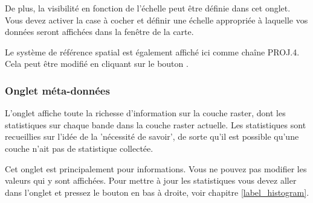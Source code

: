 De plus, la visibilité en fonction de l'échelle peut être définie dans cet
onglet. Vous devez activer la case à cocher et définir une échelle appropriée à
laquelle vos données seront affichées dans la fenêtre de la carte.

Le système de référence spatial est également affiché ici comme chaîne PROJ.4.
Cela peut être modifié en cliquant sur le bouton .

\subsubsection{Onglet méta-données}\label{label_metatab}

L'onglet  affiche toute la richesse d'information sur la
couche raster, dont les statistiques sur chaque bande dans la couche raster
actuelle. Les statistiques sont recueillies sur l'idée de la 'nécessité de
savoir', de sorte qu'il est possible qu'une couche n'ait pas de
statistique collectée. 

Cet onglet est principalement pour informations. Vous ne pouvez pas modifier
les valeurs qui y sont affichées. Pour mettre à jour les statistiques vous
devez aller dans l'onglet  et pressez le bouton
 en bas à droite, voir chapitre \ref{label_histogram}.

